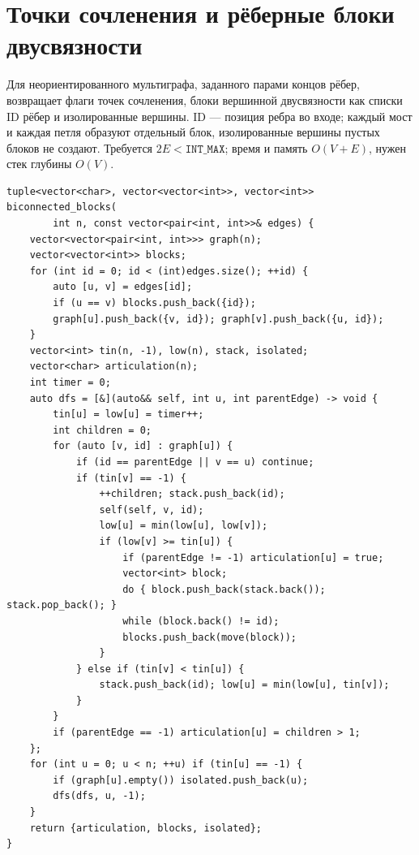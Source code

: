 \section{Точки сочленения и рёберные блоки двусвязности}
Для неориентированного мультиграфа, заданного парами концов рёбер, возвращает флаги точек сочленения, блоки вершинной двусвязности как списки ID рёбер и изолированные вершины.
ID --- позиция ребра во входе; каждый мост и каждая петля образуют отдельный блок, изолированные вершины пустых блоков не создают.
Требуется $2E<\texttt{INT\_MAX}$; время и память $O(V+E)$, нужен стек глубины $O(V)$.
\begin{lstlisting}[name=advanced_graph_biconnected]
tuple<vector<char>, vector<vector<int>>, vector<int>> biconnected_blocks(
        int n, const vector<pair<int, int>>& edges) {
    vector<vector<pair<int, int>>> graph(n);
    vector<vector<int>> blocks;
    for (int id = 0; id < (int)edges.size(); ++id) {
        auto [u, v] = edges[id];
        if (u == v) blocks.push_back({id});
        graph[u].push_back({v, id}); graph[v].push_back({u, id});
    }
    vector<int> tin(n, -1), low(n), stack, isolated;
    vector<char> articulation(n);
    int timer = 0;
    auto dfs = [&](auto&& self, int u, int parentEdge) -> void {
        tin[u] = low[u] = timer++;
        int children = 0;
        for (auto [v, id] : graph[u]) {
            if (id == parentEdge || v == u) continue;
            if (tin[v] == -1) {
                ++children; stack.push_back(id);
                self(self, v, id);
                low[u] = min(low[u], low[v]);
                if (low[v] >= tin[u]) {
                    if (parentEdge != -1) articulation[u] = true;
                    vector<int> block;
                    do { block.push_back(stack.back()); stack.pop_back(); }
                    while (block.back() != id);
                    blocks.push_back(move(block));
                }
            } else if (tin[v] < tin[u]) {
                stack.push_back(id); low[u] = min(low[u], tin[v]);
            }
        }
        if (parentEdge == -1) articulation[u] = children > 1;
    };
    for (int u = 0; u < n; ++u) if (tin[u] == -1) {
        if (graph[u].empty()) isolated.push_back(u);
        dfs(dfs, u, -1);
    }
    return {articulation, blocks, isolated};
}
\end{lstlisting}
%

